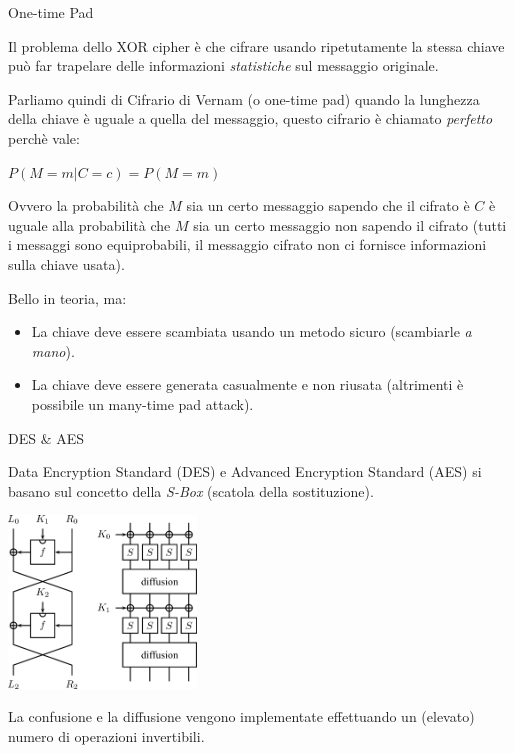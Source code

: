 \documentclass[handout, xcolor=dvipsnames,aspectratio=169]{beamer}
\begin{document}
\begin{frame}{One-time Pad}
  
  \pause
  
  Il problema dello XOR cipher è che cifrare usando ripetutamente la stessa chiave può far trapelare delle informazioni \textit{statistiche} sul messaggio originale.
  
  \medskip
  
  \pause
  Parliamo quindi di Cifrario di Vernam (o one-time pad) quando la lunghezza della chiave è uguale a quella del messaggio, questo cifrario è chiamato \textit{perfetto} perchè vale:
  
  \medskip
  
  $P(M = m | C = c) = P(M = m)$
  
  \medskip
  
  Ovvero la probabilità che $M$ sia un certo messaggio sapendo che il cifrato è $C$ è uguale alla probabilità che $M$ sia un certo messaggio non sapendo il cifrato (tutti i messaggi sono equiprobabili, il messaggio cifrato non ci fornisce informazioni sulla chiave usata).
  
  \medskip
  
  \pause

  Bello in teoria, ma:
  
  \begin{itemize}
    \item La chiave deve essere scambiata usando un metodo sicuro (scambiarle \textit{a mano}).
    \item La chiave deve essere generata casualmente e non riusata (altrimenti è possibile un many-time pad attack).
  \end{itemize}
  
\end{frame}

\begin{frame}{DES \& AES}
  
  Data Encryption Standard (DES) e Advanced Encryption Standard (AES) si basano sul concetto della \textit{S-Box} (scatola della sostituzione).

  \pause
  
  \medskip
  
  \centering\includegraphics[width=5cm]{img/des} 
  
  \medskip

  La confusione e la diffusione vengono implementate effettuando un (elevato) numero di operazioni invertibili.
  
\end{frame}
\end{document}
